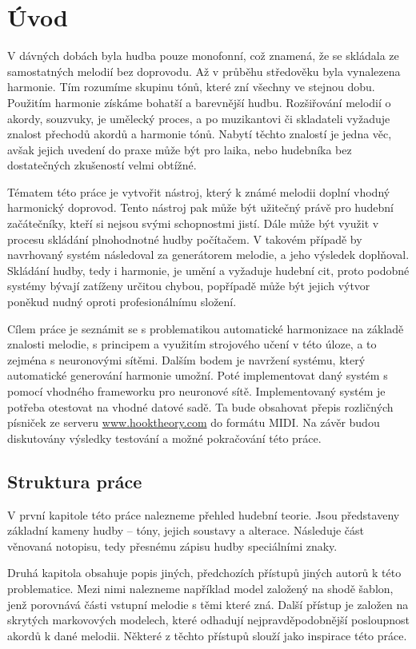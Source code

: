 \chapter{Úvod}
\label{uvod}

V dávných dobách byla hudba pouze monofonní, což znamená, 
že se skládala ze samostatných melodií bez doprovodu.
Až v průběhu středověku byla vynalezena harmonie.
Tím rozumíme skupinu tónů, které zní všechny ve stejnou dobu.
Použitím harmonie získáme bohatší a barevnější hudbu.
Rozšiřování melodií o akordy, souzvuky, je umělecký proces,
a po muzikantovi či skladateli vyžaduje znalost přechodů akordů a harmonie tónů.
Nabytí těchto znalostí je jedna věc, 
avšak jejich uvedení do praxe může být pro laika, 
nebo hudebníka bez dostatečných zkušeností velmi obtížné.
\par

Tématem této práce je vytvořit nástroj, 
který k známé melodii doplní vhodný harmonický doprovod.
Tento nástroj pak může být užitečný právě pro hudební začátečníky,
kteří si nejsou svými schopnostmi jistí. 
Dále může být využit v procesu skládání plnohodnotné hudby počítačem.
V takovém případě by navrhovaný systém následoval za generátorem melodie,
a jeho výsledek doplňoval.
Skládání hudby, tedy i harmonie, je umění a vyžaduje hudební cit,
proto podobné systémy bývají zatíženy určitou chybou, 
popřípadě může být jejich výtvor poněkud nudný oproti profesionálnímu složení.
\par

Cílem práce je seznámit se s problematikou automatické harmonizace na základě znalosti melodie,
s principem a využitím strojového učení v této úloze, a to zejména s neuronovými sítěmi.
Dalším bodem je navržení systému, který automatické generování harmonie umožní.
Poté implementovat daný systém s pomocí vhodného frameworku pro neuronové sítě.
Implementovaný systém je potřeba otestovat na vhodné datové sadě. 
Ta bude obsahovat přepis rozličných písniček ze serveru \url{www.hooktheory.com}
do formátu MIDI.
Na závěr budou diskutovány výsledky testování a možné pokračování této práce.

\section{Struktura práce}
V první kapitole této práce nalezneme přehled hudební teorie.
Jsou představeny základní kameny hudby -- tóny, jejich soustavy a alterace.
Následuje část věnovaná notopisu,
tedy přesnému zápisu hudby speciálními znaky.
\par
Druhá kapitola obsahuje popis jiných, předchozích přístupů jiných autorů k této problematice.
Mezi nimi nalezneme například model založený na shodě šablon, 
jenž porovnává části vstupní melodie s těmi které zná.
Další přístup je založen na skrytých markovových modelech, 
které odhadují nejpravděpodobnější posloupnost akordů k dané melodii.
Některé z těchto přístupů slouží jako inspirace této práce.
\par

